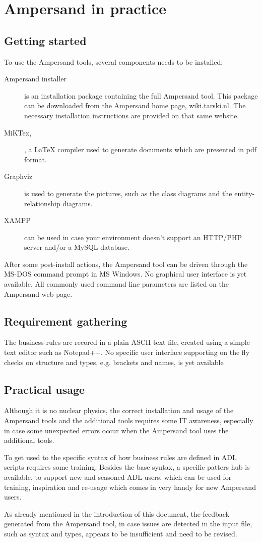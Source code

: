 
\section{Ampersand in practice}
\label{sec:InPractice}

\subsection{Getting started}
To use the Ampersand tools, several components needs to be installed:
\begin{description}
	\item[Ampersand installer] is an installation package containing the full Ampersand tool. This package can be downloaded from the Ampersand home page, wiki.tarski.nl. The necessary installation instructions are provided on that same website.
	\item[MiKTex,], a LaTeX compiler used to generate documents which are presented in pdf format.
	\item[Graphviz] is used to generate the pictures, such as the class diagrams and the entity-relationship diagrams. 
	\item[XAMPP] can be used in case your environment doesn't support an HTTP/PHP server and/or a MySQL database.
\end{description}

After some post-install actions, the Ampersand tool can be driven through the MS-DOS command prompt in MS Windows. 
No graphical user interface is yet available. All commonly used command line parameters are listed on the Ampersand web page.

\subsection{Requirement gathering}
The business rules are recored in a plain ASCII text file, created using a simple text editor such as Notepad++.
No specific user interface supporting on the fly checks on structure and types, e.g. brackets and names, is yet available 

\subsection{Practical usage}
Although it is no nuclear physics, the correct installation and usage of the Ampersand tools and the additional tools requires some IT awareness, especially in case some unexpected errors occur when the Ampersand tool uses the additional tools. 

To get used to the specific syntax of how business rules are defined in ADL scripts requires some training. 
Besides the base syntax, a specific patters hub is available, to support new and seasoned ADL users,  which can be used for training, inspiration and re-usage which comes in very handy for new Ampersand users.

As already mentioned in the introduction of this document, the feedback generated from the Ampersand tool, in case  issues are detected in the input file, such as syntax and types, appears to be insufficient and need to be revised.